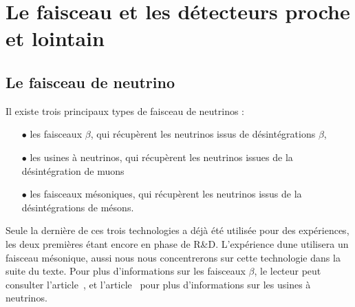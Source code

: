         
        
  \section{Le faisceau et les détecteurs proche et lointain}\label{sec::faisceau_et_det}

    \subsection{Le faisceau de neutrino}\label{sec::faisceau}

      Il existe trois principaux types de faisceau de neutrinos :
      \begin{itemize}
        \item[$\bullet$] les faisceaux $\beta$, qui récupèrent les neutrinos issus de désintégrations $\beta$,
        \item[$\bullet$] les usines à neutrinos, qui récupèrent les neutrinos issues de la désintégration de muons
        \item[$\bullet$] les faisceaux mésoniques, qui récupèrent les neutrinos issus de la désintégrations de mésons.
      \end{itemize}
      Seule la dernière de ces trois technologies a déjà été utilisée pour des expériences, les deux premières étant encore en phase de R\&D. L'expérience \gls{dune} utilisera un faisceau mésonique, aussi nous nous concentrerons sur cette technologie dans la suite du texte. Pour plus d'informations sur les faisceaux $\beta$, le lecteur peut consulter l'article~\cite{Wildner2012}, et l'article~\cite{Bogomilov2014} pour plus d'informations sur les usines à neutrinos.
        
